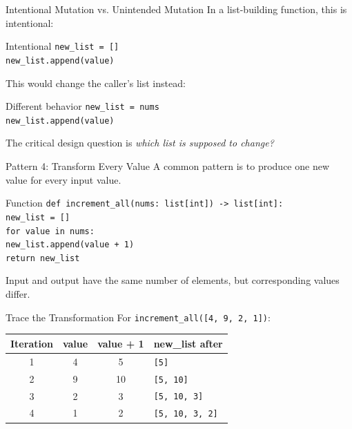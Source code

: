 \documentclass[aspectratio=169,10pt]{beamer}
\begin{document}
\begin{frame}{Intentional Mutation vs. Unintended Mutation}
  In a list-building function, this is intentional:

  \begin{block}{Intentional}
    \texttt{new\_list = []}\\
    \texttt{new\_list.append(value)}
  \end{block}

  This would change the caller's list instead:

  \begin{block}{Different behavior}
    \texttt{new\_list = nums}\\
    \texttt{new\_list.append(value)}
  \end{block}

  \begin{keyidea}
    The critical design question is \emph{which list is supposed to change?}
  \end{keyidea}
\end{frame}

\begin{frame}{Pattern 4: Transform Every Value}
  A common pattern is to produce one new value for every input value.

  \begin{block}{Function}
    \texttt{def increment\_all(nums: list[int]) -> list[int]:}\\
    \hspace{0.20in}\texttt{new\_list = []}\\
    \hspace{0.20in}\texttt{for value in nums:}\\
    \hspace{0.40in}\texttt{new\_list.append(value + 1)}\\
    \hspace{0.20in}\texttt{return new\_list}
  \end{block}

  Input and output have the same number of elements, but corresponding values differ.
\end{frame}

\begin{frame}{Trace the Transformation}
  For \texttt{increment\_all([4, 9, 2, 1])}:

  \begin{center}
    \renewcommand{\arraystretch}{1.25}
    \begin{tabular}{c|c|c|l}
      \textbf{Iteration} & \textbf{value} & \textbf{value + 1} & \textbf{new\_list after} \\\hline
      1 & 4 & 5 & \texttt{[5]} \\
      2 & 9 & 10 & \texttt{[5, 10]} \\
      3 & 2 & 3 & \texttt{[5, 10, 3]} \\
      4 & 1 & 2 & \texttt{[5, 10, 3, 2]}
    \end{tabular}
  \end{center}
\end{frame}
\end{document}

